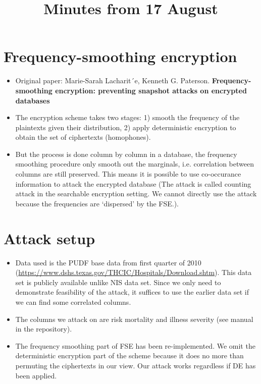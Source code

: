\documentclass{article}
\title{Minutes from 17 August}
\begin{document}
	
\section{Frequency-smoothing encryption}
\begin{itemize}
	\item Original paper: Marie-Sarah Lacharit´e, Kenneth G. Paterson. \textbf{Frequency-smoothing encryption: preventing snapshot attacks on encrypted databases}
	
	\item The encryption scheme takes two stages: 1) smooth the frequency of the plaintexts given their distribution, 2) apply deterministic encryption to obtain the set of ciphertexts (homophones).
	
	\item But the process is done column by column in a database, the frequency smoothing procedure only smooth out the marginals, i.e. correlation between columns are still preserved. This means it is possible to use co-occurance information to attack the encrypted database (The attack is called counting attack in the searchable encryption setting. We cannot directly use the attack because the frequencies are `dispersed' by the FSE.).
\end{itemize}
	

\section{Attack setup}
\begin{itemize}
	\item Data used is the PUDF base data from first quarter of 2010 (\url{https://www.dshs.texas.gov/THCIC/Hospitals/Download.shtm}). This data set is publicly available unlike NIS data set. Since we only need to demonstrate feasibility of the attack, it suffices to use the earlier data set if we can find some correlated columns.
	
	\item The columns we attack on are risk mortality and illness severity (see manual in the repository).
	
	\item The frequency smoothing part of FSE has been re-implemented. We omit the deterministic encryption part of the scheme because it does no more than permuting the ciphertexts in our view. Our attack works regardless if DE has been applied.
\end{itemize}
\end{document}
